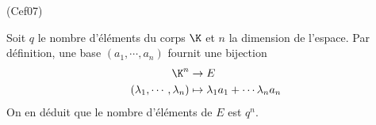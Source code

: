 \begin{tiny}(Cef07)\end{tiny} Soit $q$ le nombre d'éléments du corps $\K$ et $n$ la dimension de l'espace. Par définition, une base $(a_1,\cdots ,a_n)$ fournit une bijection
\begin{displaymath}
 \begin{aligned}
  \K^n &\rightarrow E \\
(\lambda_1,\cdots, \lambda_n) &\mapsto \lambda_1 a_1 + \cdots \lambda_n a_n
 \end{aligned}
\end{displaymath}
On en déduit que le nombre d'éléments de $E$ est $q^n$. 